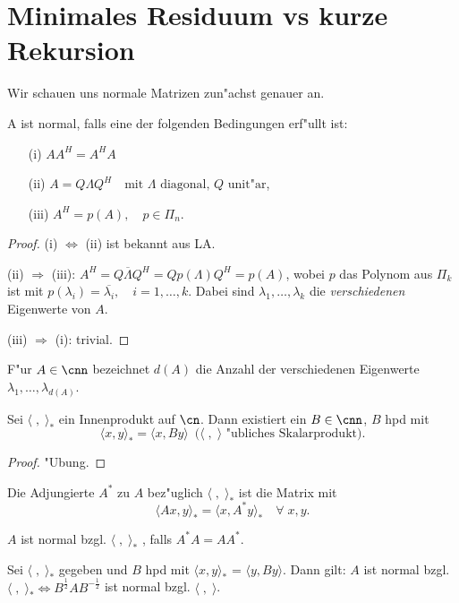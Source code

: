 \section{Minimales Residuum vs kurze Rekursion}
Wir schauen uns normale Matrizen zun"achst genauer an.
\begin{lem}
A ist normal, falls eine der folgenden Bedingungen erf"ullt ist:
\begin{itemize}
 \item[(i)] $AA^H =  A^HA $
 \item[(ii)] $A =  Q \Lambda Q^H \quad \text{mit $\Lambda$ diagonal, $Q$ unit"ar} $,
 \item[(iii)] $A^H=p(A), \quad p \in \Pi_n.$
\end{itemize}
\end{lem}
\begin{proof}
 (i) $\Leftrightarrow$ (ii) ist bekannt aus LA.

 (ii) $\Longrightarrow$ (iii): $A^H = Q \overline{\Lambda} Q^H = Q p(\Lambda) Q^H = p(A)$,  wobei $p$ das Polynom aus
$\Pi_k$ ist mit $p(\lambda_i)=\overline{\lambda_i}, \quad i=1, \dots,k$. Dabei sind  $\lambda_1,\dots,\lambda_k$ die {\em verschiedenen}
Eigenwerte von $A$.

 (iii) $\Longrightarrow$ (i): trivial.
\end{proof}
%
\begin{defn}
 F"ur $A \in \cnn$ bezeichnet $d(A)$ die Anzahl der verschiedenen Eigenwerte $\lambda_1,\dots,\lambda_{d(A)}$.
\end{defn}
%
\begin{lem}
 Sei $\langle \; , \; \rangle_*$ ein Innenprodukt auf  $\cn$.
 Dann existiert ein $B \in \cnn$, $B$ hpd mit
\[\langle x , y \rangle_* = \langle x,B y \rangle \enspace (\mbox{$\langle \; , \; \rangle$ "ubliches Skalarprodukt).} \]
\end{lem}
\begin{proof}
 "Ubung.
\end{proof}
%
\begin{defn}
 Die Adjungierte $A^*$ zu $A$ bez"uglich $\langle \; , \; \rangle_*$ ist die Matrix mit
\[
 \langle Ax , y  \rangle_* = \langle x, A^*y\rangle_* \quad \forall \; x,y.
\]
\end{defn}
%
\begin{defn}
 $A$ ist normal bzgl. $\langle \; , \; \rangle_*$ , falls $A^*A=AA^*$.
\end{defn}
%
\begin{sa}
 Sei $\langle \; , \; \rangle_*$ gegeben und $B$ hpd mit $\langle x, y \rangle_*$ = $\langle y, By\rangle$. Dann gilt:  $A$ ist normal bzgl.
$\langle \; , \; \rangle_* \Longleftrightarrow B^{\frac{1}{2}}AB^{-\frac{1}{2}} $ ist normal bzgl. $\langle \; , \; \rangle$.
\end{sa}
